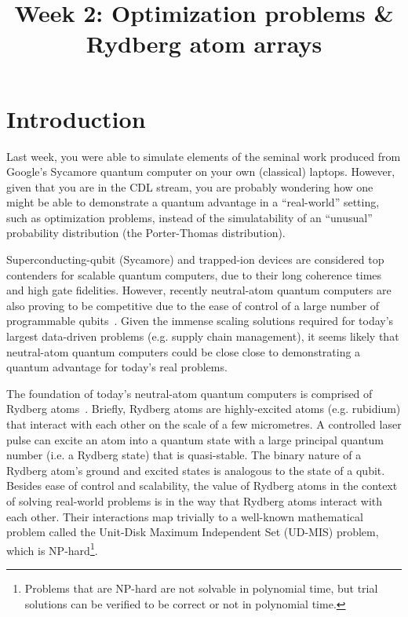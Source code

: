 \documentclass[12pt]{article}
\title{Week 2: Optimization problems \& Rydberg atom arrays}
\author{}
\date{}
\begin{document}
\maketitle

\thispagestyle{empty}

\section*{Introduction}

Last week, you were able to simulate elements of the seminal work produced from Google's Sycamore quantum computer on your own (classical) laptops.
However, given that you are in the CDL stream, you are probably wondering how one might be able to demonstrate a quantum advantage in a ``real-world'' setting, such as optimization problems, instead of the simulatability of an ``unusual'' probability distribution (the Porter-Thomas distribution).

Superconducting-qubit (Sycamore) and trapped-ion devices are considered top contenders for scalable quantum computers, due to their long coherence times and
high gate fidelities.  However, recently neutral-atom quantum computers are also proving to be competitive due to the ease of control of a large number of programmable
qubits~\cite{serret_solving_2020,bernien_probing_2017,ebadi_quantum_2020,henriet_quantum_2020,Browaeys2020}.
Given the immense scaling solutions required for today's largest data-driven problems (e.g. supply chain management), it seems 
likely that neutral-atom quantum computers could be close close to demonstrating a quantum advantage for today's real problems.

The foundation of today's neutral-atom quantum computers is comprised of Rydberg atoms~\cite{Browaeys2020}.
Briefly, Rydberg atoms are highly-excited atoms (e.g. rubidium) that interact with each other on the scale of a few micrometres.
A controlled laser pulse can excite an atom into a quantum state with a large principal quantum number (i.e. a Rydberg state) that is quasi-stable.
The binary nature of a Rydberg atom's ground and excited states is analogous to the state of a qubit.
Besides ease of control and scalability, the value of Rydberg atoms in the context of solving real-world problems is in the way that Rydberg atoms interact with each other. 
Their interactions map trivially to a well-known mathematical problem called the Unit-Disk Maximum Independent Set (UD-MIS) problem, which is NP-hard\footnote{Problems that are NP-hard are not solvable in polynomial time, but trial solutions can be verified to be correct or not in polynomial time.}.
\end{document}
